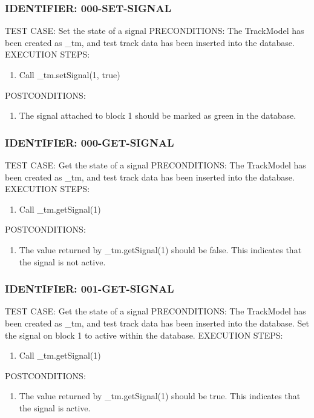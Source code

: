 \documentclass{scrreprt}
\begin{document}
\subsubsection{IDENTIFIER: 000-SET-SIGNAL}
TEST CASE: Set the state of a signal
PRECONDITIONS: The TrackModel has been created as _tm, and test track data has been inserted into the database.
EXECUTION STEPS:
\begin{enumerate}
	\item Call _tm.setSignal(1, true)
\end{enumerate}
POSTCONDITIONS:
\begin{enumerate}
	\item The signal attached to block 1 should be marked as green in the database.
\end{enumerate}

\subsubsection{IDENTIFIER: 000-GET-SIGNAL}
TEST CASE: Get the state of a signal
PRECONDITIONS: The TrackModel has been created as _tm, and test track data has been inserted into the database.
EXECUTION STEPS:
\begin{enumerate}
	\item Call _tm.getSignal(1)
\end{enumerate}
POSTCONDITIONS:
\begin{enumerate}
	\item The value returned by _tm.getSignal(1) should be false. This indicates that the signal is not active.
\end{enumerate}

\subsubsection{IDENTIFIER: 001-GET-SIGNAL}
TEST CASE: Get the state of a signal
PRECONDITIONS: The TrackModel has been created as _tm, and test track data has been inserted into the database. Set the signal on block 1 to active within the database.
EXECUTION STEPS:
\begin{enumerate}
	\item Call _tm.getSignal(1)
\end{enumerate}
POSTCONDITIONS:
\begin{enumerate}
	\item The value returned by _tm.getSignal(1) should be true. This indicates that the signal is active.
\end{enumerate}
\end{document}
